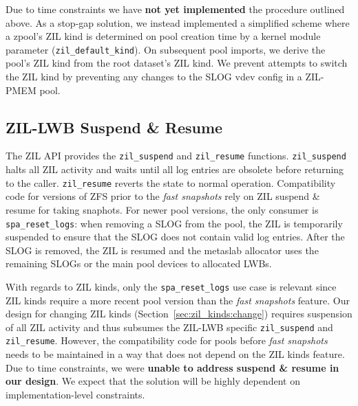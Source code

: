 \documentclass[12pt,a4paper,twoside]{book}
\begin{document}
Due to time constraints we have \textbf{not yet implemented} the procedure outlined above.
As a stop-gap solution, we instead implemented a simplified scheme where a zpool's ZIL kind is determined on pool creation time by a kernel module parameter (\lstinline{zil_default_kind}).
On subsequent pool imports, we derive the pool's ZIL kind from the root dataset's ZIL kind.
We prevent attempts to switch the ZIL kind by preventing any changes to the SLOG vdev config in a ZIL-PMEM pool.


\subsection{ZIL-LWB Suspend \& Resume}\label{sec:zil_kinds:suspend_resume}
The ZIL API provides the \lstinline{zil_suspend} and \lstinline{zil_resume} functions.
\lstinline{zil_suspend} halts all ZIL activity and waits until all log entries are obsolete before returning to the caller.
\lstinline{zil_resume} reverts the state to normal operation.
Compatibility code for versions of ZFS prior to the \textit{fast snapshots} rely on ZIL suspend \& resume for taking snaphots.
For newer pool versions, the only consumer is \lstinline{spa_reset_logs}: when removing a SLOG from the pool, the ZIL is temporarily suspended to ensure that the SLOG does not contain valid log entries.
After the SLOG is removed, the ZIL is resumed and the metaslab allocator uses the remaining SLOGs or the main pool devices to allocated LWBs.

With regards to ZIL kinds, only the \lstinline{spa_reset_logs} use case is relevant since ZIL kinds require a more recent pool version than the \textit{fast snapshots} feature.
Our design for changing ZIL kinds (Section~\ref{sec:zil_kinds:change}) requires suspension of all ZIL activity and thus subsumes the ZIL-LWB specific \lstinline{zil_suspend} and \lstinline{zil_resume}.
However, the compatibility code for pools before \textit{fast snapshots} needs to be maintained in a way that does not depend on the ZIL kinds feature.
Due to time constraints, we were \textbf{unable to address suspend \& resume in our design}.
We expect that the solution will be highly dependent on implementation-level constraints.
\end{document}

